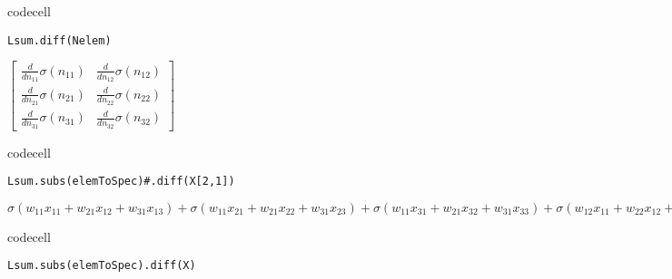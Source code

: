 codecell

\begin{verbatim}
Lsum.diff(Nelem)
\end{verbatim}

$\displaystyle \left[\begin{matrix}\frac{d}{d n_{11}} \sigma{\left(n_{11} \right)} & \frac{d}{d n_{12}} \sigma{\left(n_{12} \right)}\\\frac{d}{d n_{21}} \sigma{\left(n_{21} \right)} & \frac{d}{d n_{22}} \sigma{\left(n_{22} \right)}\\\frac{d}{d n_{31}} \sigma{\left(n_{31} \right)} & \frac{d}{d n_{32}} \sigma{\left(n_{32} \right)}\end{matrix}\right]$

codecell

\begin{verbatim}
Lsum.subs(elemToSpec)#.diff(X[2,1])
\end{verbatim}

$\displaystyle \sigma{\left(w_{11} x_{11} + w_{21} x_{12} + w_{31} x_{13} \right)} + \sigma{\left(w_{11} x_{21} + w_{21} x_{22} + w_{31} x_{23} \right)} + \sigma{\left(w_{11} x_{31} + w_{21} x_{32} + w_{31} x_{33} \right)} + \sigma{\left(w_{12} x_{11} + w_{22} x_{12} + w_{32} x_{13} \right)} + \sigma{\left(w_{12} x_{21} + w_{22} x_{22} + w_{32} x_{23} \right)} + \sigma{\left(w_{12} x_{31} + w_{22} x_{32} + w_{32} x_{33} \right)}$

codecell

\begin{verbatim}
Lsum.subs(elemToSpec).diff(X)
\end{verbatim}

